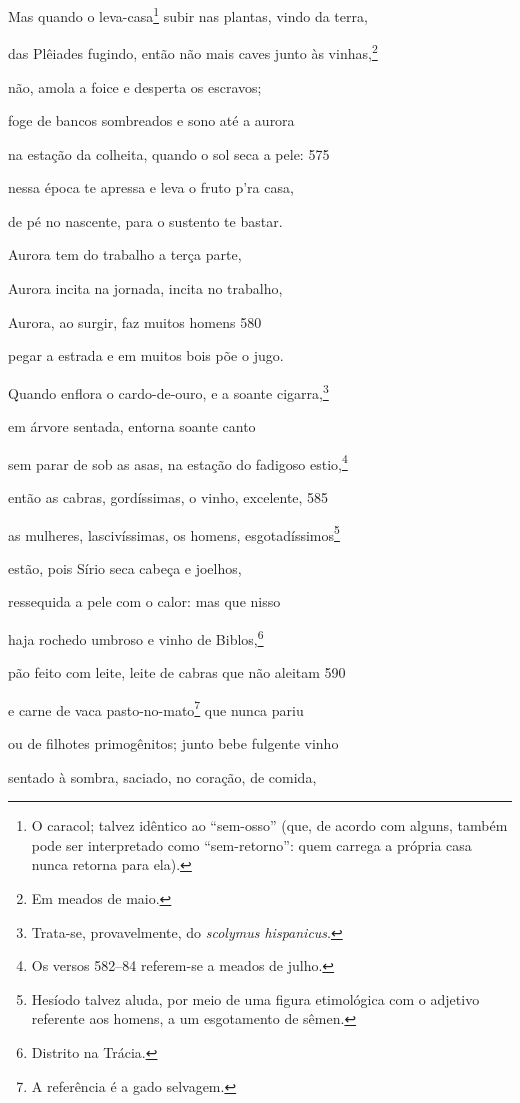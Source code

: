 Mas quando o leva-casa\footnote{O caracol; talvez idêntico ao ``sem-osso'' (que, de acordo com alguns, também pode ser interpretado como ``sem-retorno'': quem carrega
a própria casa nunca retorna para ela).} subir nas plantas, vindo da terra,

das Plêiades fugindo, então não mais caves junto às vinhas,\footnote{Em meados de maio.}

não, amola a foice e desperta os escravos;

foge de bancos sombreados e sono até a aurora

na estação da colheita, quando o sol seca a pele: \num{575}

nessa época te apressa e leva o fruto p'ra casa,

de pé no nascente, para o sustento te bastar.

Aurora tem do trabalho a terça parte,

Aurora incita na jornada, incita no trabalho,

Aurora, ao surgir, faz muitos homens \num{580}

pegar a estrada e em muitos bois põe o jugo.

Quando enflora o cardo-de-ouro, e a soante cigarra,\footnote{Trata-se, provavelmente, do \emph{scolymus hispanicus}.}

em árvore sentada, entorna soante canto

sem parar de sob as asas, na estação do fadigoso estio,\footnote{Os versos 582--84 referem-se a meados de julho.}

então as cabras, gordíssimas, o vinho, excelente, \num{585}

as mulheres, lascivíssimas, os homens, esgotadíssimos\footnote{Hesíodo talvez aluda, por meio de uma figura etimológica com o
adjetivo referente aos homens, a um esgotamento de sêmen.}

estão, pois Sírio seca cabeça e joelhos,

ressequida a pele com o calor: mas que nisso

haja rochedo umbroso e vinho de Biblos,\footnote{Distrito na Trácia.}

pão feito com leite, leite de cabras que não aleitam \num{590}

e carne de vaca pasto-no-mato\footnote{A referência é a gado selvagem.} que nunca pariu

ou de filhotes primogênitos; junto bebe fulgente vinho

sentado à sombra, saciado, no coração, de comida,

